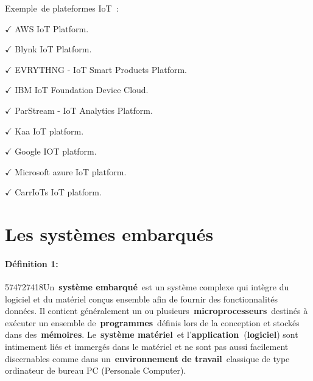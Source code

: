 \documentclass[12pt,a4paper]{report}
\begin{document}
\begin{flushleft}
	\noindent Exemple~de plateformes IoT~: 
	
	\noindent $\mathrm{\checkmark}$ AWS IoT Platform. 
	
	\noindent $\mathrm{\checkmark}$ Blynk IoT Platform. 
	
	\noindent $\mathrm{\checkmark}$ EVRYTHNG - IoT Smart Products Platform. 
	
	\noindent $\mathrm{\checkmark}$ IBM IoT Foundation Device Cloud. 
	
	\noindent $\mathrm{\checkmark}$ ParStream - IoT Analytics Platform. 
	
	\noindent $\mathrm{\checkmark}$ Kaa IoT platform. 
	
	\noindent $\mathrm{\checkmark}$ Google IOT platform.
	
	\noindent  $\mathrm{\checkmark}$ Microsoft azure IoT platform.
	
	\noindent  $\mathrm{\checkmark}$ CarrIoTs IoT platform.
	
	\noindent 
	
	\noindent 
	
	\noindent 
	
	\noindent 
	
	\noindent 
	
	\noindent 
	
	\noindent 
	
	\section{Les syst\`{e}mes embarqu\'{e}s}
	
	\paragraph{D\'{e}finition 1:}
	
	\noindent 574727418Un~\textbf{syst\`{e}me embarqu\'{e}}~est un syst\`{e}me complexe qui int\`{e}gre du logiciel et du mat\'{e}riel con\c{c}us ensemble afin de fournir des fonctionnalit\'{e}s donn\'{e}es. Il contient g\'{e}n\'{e}ralement un ou plusieurs~\textbf{microprocesseurs}~destin\'{e}s \`{a} ex\'{e}cuter un ensemble de~\textbf{programmes}~d\'{e}finis lors de la conception et stock\'{e}s dans des~\textbf{m\'{e}moires}. Le~\textbf{syst\`{e}me mat\'{e}riel}~et l'\textbf{application~}(\textbf{logiciel}) sont intimement li\'{e}s et immerg\'{e}s dans le mat\'{e}riel et ne sont pas aussi facilement discernables comme dans un~\textbf{environnement de travail}~classique de type ordinateur de bureau PC (Personale Computer).
	

\end{flushleft}
\end{document}
